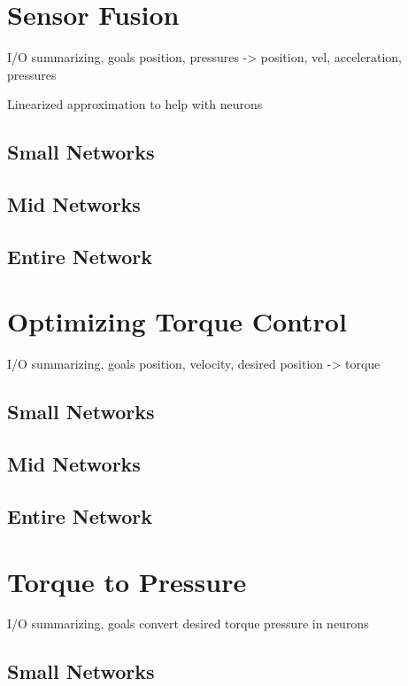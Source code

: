 \section{Sensor Fusion}

I/O summarizing, goals
position, pressures -> position, vel, acceleration, pressures


Linearized approximation to help with neurons

\subsection{Small Networks}

\subsection{Mid Networks}

\subsection{Entire Network}

\section{Optimizing Torque Control}

I/O summarizing, goals
position, velocity, desired position -> torque

\subsection{Small Networks}

\subsection{Mid Networks}

\subsection{Entire Network}

\section{Torque to Pressure}

I/O summarizing, goals
convert desired torque pressure in neurons

\subsection{Small Networks}

